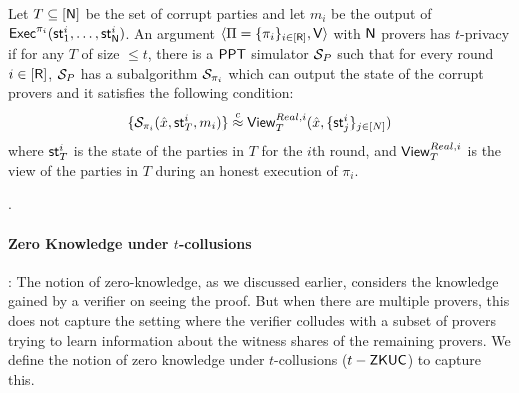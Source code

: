 \begin{definition}
Let $T\subseteq [\mathsf{N}]$ be the set of corrupt parties and let $m_i$ be the output of $\mathsf{Exec}^{\pi_i}(\mathsf{st}^i_1, \ldots, \mathsf{st}^i_{\mathsf{N}})$. An argument $\langle \Pi = \{\pi_i\}_{i \in [\mathsf{R}]},\mathsf{V}\rangle$ with $\mathsf{N}$ provers has $t$-privacy if for any $T$ of size $\leq t$, there is a $\mathsf{PPT}$ simulator $\mathcal{S}_{P}$ such that for every round $i \in [\mathsf{R}]$, $\mathcal{S}_{P}$ has a subalgorithm  $\mathcal{S}_{\pi_i}$ which can output the state of the corrupt provers and it satisfies the following condition: 
\[
 \{ \mathcal{S}_{\pi_i} (\hat{x}, \mathsf{st}^i_T, m_i) \} \stackrel{c}{\approx}  \mathsf{View}^{Real, i}_T ( \hat{x}, \{\mathsf{st}^i_j\}_{j \in [N]}) 
\]
where $\mathsf{st}^i_T$ is the state of the parties in $T$ for the $i$th round, and $\mathsf{View}^{Real, i}_T$ is the view of the parties in $T$ during an honest execution of $\pi_i$.
\end{definition}
.

\paragraph{Zero Knowledge under $t$-collusions}: 
The notion of zero-knowledge, as we discussed earlier, considers the knowledge gained by a verifier on seeing the proof. But when there are multiple provers, this does not capture the setting where the verifier colludes with a subset of provers trying to learn information about the witness shares of the remaining provers. We define the notion of zero knowledge under $t$-collusions ($t-\mathsf{ZKUC}$) to capture this.

